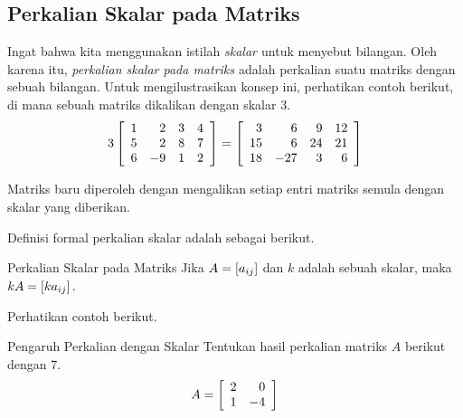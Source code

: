 \subsection{Perkalian Skalar pada Matriks}

Ingat bahwa kita menggunakan istilah {\em skalar \em} untuk menyebut bilangan. Oleh karena itu, {\em perkalian skalar pada matriks \em} adalah perkalian suatu matriks dengan sebuah bilangan.  
Untuk mengilustrasikan konsep ini, perhatikan contoh berikut, di mana sebuah
matriks dikalikan dengan skalar $3$.
\begin{equation*}
3\left[
\begin{array}{rrrr}
1 & 2 & 3 & 4 \\
5 & 2 & 8 & 7 \\
6 & -9 & 1 & 2
\end{array}
\right] = \left[
\begin{array}{rrrr}
3 & 6 & 9 & 12 \\
15 & 6 & 24 & 21 \\
18 & -27 & 3 & 6
\end{array}
\right] 
\end{equation*}

Matriks baru diperoleh dengan mengalikan setiap entri matriks semula
dengan skalar yang diberikan. 

Definisi formal perkalian skalar adalah sebagai berikut.

\begin{definition}{Perkalian Skalar pada Matriks}\label{def:scalarmultofmatrices}
Jika $A=\left[ a_{ij}\right] $ dan $k$ adalah sebuah skalar,
maka $kA=\left[ ka_{ij}\right] .$ 
\end{definition}

Perhatikan contoh berikut.

\begin{example}{Pengaruh Perkalian dengan Skalar}\label{exa:effectofscalarmult}
Tentukan hasil perkalian matriks $A$ berikut dengan $7$.
\begin{equation*}
A=\left[
\begin{array}{rr}
2 & 0 \\
1 & -4
\end{array}
\right]
\end{equation*}
\end{example}

